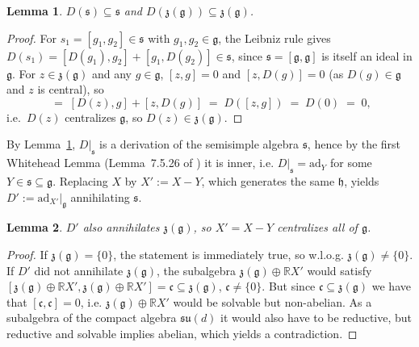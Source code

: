 \documentclass{article}
\newtheorem{lemma}{Lemma}
\begin{document}
\begin{lemma}
\label{lem:D-respects-splitting}
$D(\mathfrak s)\subseteq\mathfrak s$ and $D(\mathfrak z(\mathfrak g))\subseteq\mathfrak z(\mathfrak g)$.
\end{lemma}
\begin{proof}
For $s_1=[g_1,g_2]\in\mathfrak s$ with $g_1,g_2\in\mathfrak g$, the Leibniz rule gives $D(s_1)=[D(g_1),g_2]+[g_1,D(g_2)]\in\mathfrak s$, since $\mathfrak s=[\mathfrak g,\mathfrak g]$ is itself an ideal in $\mathfrak g$. For $z\in\mathfrak z(\mathfrak g)$ and any $g\in\mathfrak g$, $[z,g]=0$ and $[z,D(g)]=0$ (as $D(g)\in\mathfrak g$ and $z$ is central), so
\begin{equation}
[D(z),g] \;=\; [D(z),g]+[z,D(g)] \;=\; D([z,g]) \;=\; D(0) \;=\; 0,
\end{equation}
i.e.\ $D(z)$ centralizes $\mathfrak g$, so $D(z)\in\mathfrak z(\mathfrak g)$.
\end{proof}

By Lemma~\ref{lem:D-respects-splitting}, $D\vert_{\mathfrak s}$ is a derivation of the semisimple algebra $\mathfrak s$, hence by the first Whitehead Lemma (Lemma~7.5.26 of \cite{hilgert_structure_2012}) it is inner, i.e. $D\vert_{\mathfrak s}=\mathrm{ad}_Y$ for some $Y\in\mathfrak s\subseteq\mathfrak g$. Replacing $X$ by $X':=X-Y$, which generates the same $\mathfrak h$, yields $D':=\mathrm{ad}_{X'}\vert_{\mathfrak g}$ annihilating $\mathfrak s$.

\begin{lemma}
\label{lem:X-centralizes}
$D'$ also annihilates $\mathfrak z(\mathfrak g)$, so $X'=X-Y$ centralizes all of $\mathfrak g$.
\end{lemma}
\begin{proof}
If \(\mathfrak{z}(\mathfrak{g}) = \{0\}\), the statement is immediately true, so w.l.o.g. \(\mathfrak{z}(\mathfrak{g}) \neq \{0\}\).
If \(D'\) did not annihilate $\mathfrak z(\mathfrak g)$, the subalgebra $\mathfrak z(\mathfrak g)\oplus\mathbb R X'$ would satisfy $[\mathfrak z(\mathfrak g)\oplus\mathbb R X', \mathfrak z(\mathfrak g)\oplus\mathbb R X'] = \mathfrak{c} \subseteq \mathfrak z(\mathfrak g)$, \(\mathfrak{c} \neq \{0\}\).
But since \(\mathfrak{c} \subseteq \mathfrak z(\mathfrak g)\) we have that $[\mathfrak c,\mathfrak c]=0$, i.e. $\mathfrak z(\mathfrak g)\oplus\mathbb R X'$ would be solvable but non-abelian.
As a subalgebra of the compact algebra $\mathfrak{su}(d)$ it would also have to be reductive, but reductive and solvable implies abelian, which yields a contradiction.
\end{proof}
\end{document}
